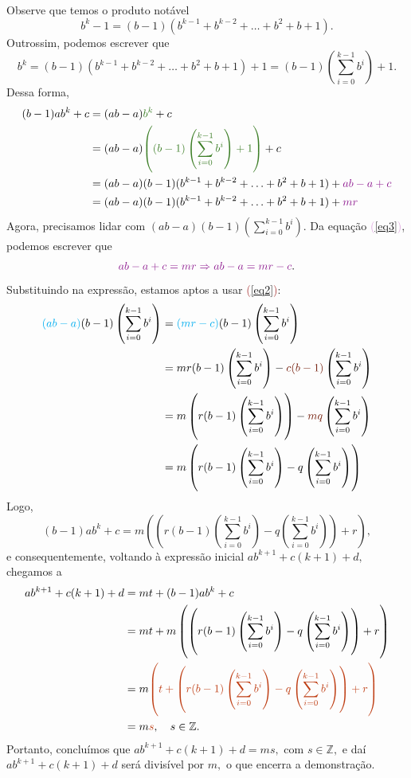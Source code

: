 \documentclass[12pt, a4paper]{article}
\begin{document}
\begin{solution}
Observe que temos o produto notável
\[
b^k - 1 = (b-1)(b^{k-1} + b^{k-2} + \ldots + b^2 + b + 1).
\]
Outrossim, podemos escrever que 
\[
b^k = (b-1)(b^{k-1} + b^{k-2} + \ldots + b^2 + b + 1) + 1 = (b-1) \left( \sum\limits_{i=0}^{k-1} b^i \right) + 1.
\]
Dessa forma, 
\begin{align*}
(b-1)ab^k + c &= (ab-a)\textcolor{OliveGreen}{b^k} + c \\&= (ab-a)\textcolor{OliveGreen}{\left( (b-1) \left( \sum\limits_{i=0}^{k-1} b^i \right) + 1\right)} + c \\&= (ab-a)(b-1)(b^{k-1} + b^{k-2} + \ldots + b^2 + b + 1) + \textcolor{Plum}{ab - a + c} \\&= (ab-a)(b-1)(b^{k-1} + b^{k-2} + \ldots + b^2 + b + 1) +\textcolor{Plum}{mr} 
\end{align*}
Agora, precisamos lidar com $(ab - a)(b-1)\left( \sum\limits_{i=0}^{k-1} b^i \right).$ Da equação \textcolor{Plum}{(\ref{eq3})}, podemos escrever que
\[
\textcolor{Plum}{ab - a + c = mr \Rightarrow ab - a = mr - c}.
\]
Substituindo na expressão, estamos aptos a usar \textcolor{Brown}{(\ref{eq2})}:
\begin{align*}
    \textcolor{Cyan}{(ab - a)}(b-1)\left( \sum\limits_{i=0}^{k-1} b^i \right) &= \textcolor{Cyan}{(mr - c)}(b-1)\left( \sum\limits_{i=0}^{k-1} b^i \right) \\&= mr(b-1)\left( \sum\limits_{i=0}^{k-1} b^i \right) - \textcolor{Brown}{c(b-1)}\left( \sum\limits_{i=0}^{k-1} b^i \right) \\&= m\left(r(b-1)\left( \sum\limits_{i=0}^{k-1} b^i \right)\right) - \textcolor{Brown}{mq}\left( \sum\limits_{i=0}^{k-1} b^i \right)  \\&= m\left(r(b-1)\left( \sum\limits_{i=0}^{k-1} b^i \right) - q\left( \sum\limits_{i=0}^{k-1} b^i \right) \right)
\end{align*}
Logo,
\[
(b-1)ab^k + c =  m\left(\left(r(b-1)\left( \sum\limits_{i=0}^{k-1} b^i \right) - q\left( \sum\limits_{i=0}^{k-1} b^i \right) \right) + r \right),
\]
e consequentemente, voltando à expressão inicial $ab^{k+1} + c(k+1) + d,$ chegamos a
\begin{align*}
ab^{k+1} + c(k+1) + d &= mt + (b-1)ab^k + c \\&= 
mt + m\left(\left(r(b-1)\left( \sum\limits_{i=0}^{k-1} b^i \right) - q\left( \sum\limits_{i=0}^{k-1} b^i \right) \right) + r \right) \\&= m \textcolor{Bittersweet}{\left( t + \left(r(b-1)\left( \sum\limits_{i=0}^{k-1} b^i \right) - q\left( \sum\limits_{i=0}^{k-1} b^i \right) \right) + r \right)} \\&= m \textcolor{Bittersweet}{s}, \quad s \in \mathbb{Z}.
\end{align*}
Portanto, concluímos que $ab^{k+1} + c(k+1) + d = ms,$ com $s \in \mathbb{Z},$ e daí $ab^{k+1} + c(k+1) + d$ será divisível por $m,$ o que encerra a demonstração.
\end{solution}
\end{document}
